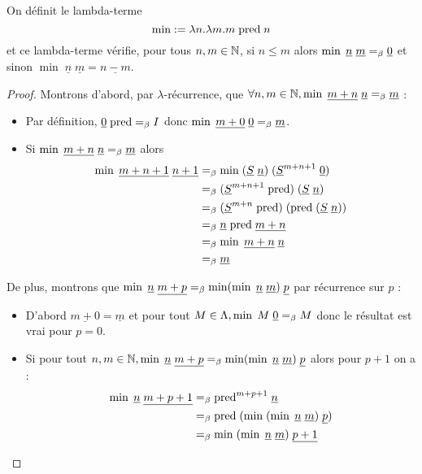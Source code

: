 \begin{defi}[Soustraction]
    On définit le lambda-terme $$\min := \lambda n.\lambda m. m\;\mathrm{pred}\;n$$ et ce lambda-terme vérifie, pour tous $n,m\in\mathbb{N}$, si $n\leq m$ alors $\min\;\underline n\;\underline m =_\beta \underline 0$ et sinon $\min\;\underline n\;\underline m = \underline{n-m}$.
\end{defi}

\begin{proof}
    Montrons d'abord, par $\lambda$-récurrence, que $\forall n,m\in\mathbb{N},\min\;\underline {m+n}\;\underline n =_\beta \underline m$ :
    \begin{itemize}[label=$\bullet$]
        \item Par définition, $\underline 0 \;\mathrm{pred} =_\beta I$ donc $\min\; \underline {m+0}\;\underline 0 =_\beta \underline m$.
        \item Si $\min\;\underline {m+n}\;\underline n =_\beta \underline m$ alors
        \begin{align*}
            \min\;\underline{m+n+1}\;\underline{n+1} &=_\beta \min\;(\underline S\;\underline n)\;(\underline S^{m+n+1}\;\underline 0)\\
            &=_\beta (\underline S^{m+n+1}\;\mathrm{pred})\;(\underline S\;\underline n)\\
            &=_\beta (\underline S^{m+n}\;\mathrm{pred})\;(\mathrm{pred}\;(\underline S\;\underline n))\\
            &=_\beta \underline n\;\mathrm{pred}\;\underline {m+n}\\
            &=_\beta \min\;\underline {m+n}\;\underline n\\
            &=_\beta \underline m
        \end{align*}
    \end{itemize}

    De plus, montrons que $\min\;\underline n\;\underline{m+p} =_\beta \min (\min\;\underline n\;\underline m)\; \underline p$ par récurrence sur $p$ :
    \begin{itemize}[label=$\bullet$]
        \item D'abord $\underline{m+0}=\underline m$ et pour tout $M\in\Lambda, \min\;M\;\underline 0 =_\beta M$ donc le résultat est vrai pour $p = 0$.
        \item Si pour tout $n,m\in\mathbb{N}, \min\;\underline n\;\underline{m+p} =_\beta \min (\min\;\underline n\;\underline m)\; \underline p$ alors pour $p+1$ on a :
        \begin{align*}
            \min\;\underline n\;\underline{m+p+1} &=_\beta \mathrm{pred}^{m+p+1}\;\underline n\\
            &=_\beta \mathrm{pred}\;(\min\;(\min\;\underline n\;\underline m)\;\underline p)\\
            &=_\beta \min\;(\min\;\underline n\;\underline m)\;\underline{p+1}
        \end{align*}
    \end{itemize}


\end{proof}
